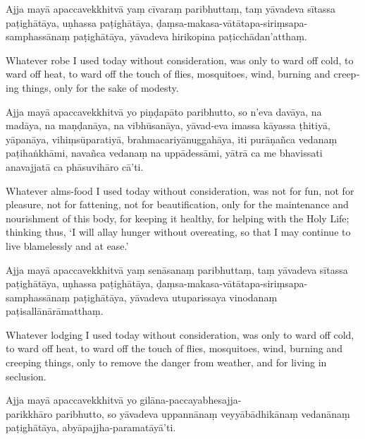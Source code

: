 \begin{leader}
\end{leader}


Ajja mayā apaccavekkhitvā yaṃ cīvaraṃ paribhuttaṃ, taṃ yāvadeva sītassa
paṭighātāya, uṇhassa paṭighātāya, ḍaṃsa-makasa-vātātapa-siriṃsapa-samphassānaṃ
paṭighātāya, yāvadeva hirikopina paṭicchādan'atthaṃ.

\begin{english}
  Whatever robe I used today without consideration, was only to ward off cold,
  to ward off heat, to ward off the touch of flies, mosquitoes, wind, burning
  and creeping things, only for the sake of modesty.
\end{english}

Ajja mayā apaccavekkhitvā yo piṇḍapāto paribhutto, so n'eva davāya, na madāya,
na maṇḍanāya, na vibhūsanāya, yāvad-eva imassa kāyassa ṭhitiyā, yāpanāya,
vihiṃsūparatiyā, brahmacariyānuggahāya, iti purāṇañca vedanaṃ paṭihaṅkhāmi,
navañca vedanaṃ na uppādessāmi, yātrā ca me bhavissati anavajjatā ca phāsuvihāro
cā'ti.

\begin{english}
  Whatever alms-food I used today without consideration, was not for fun, not
  for pleasure, not for fattening, not for beautification, only for the
  maintenance and nourishment of this body, for keeping it healthy, for helping
  with the Holy Life; thinking thus, `I will allay hunger without overeating, so
  that I may continue to live blamelessly and at ease.'
\end{english}

Ajja mayā apaccavekkhitvā yaṃ senāsanaṃ paribhuttaṃ, taṃ yāvadeva sītassa
paṭighātāya, uṇhassa paṭighātāya, ḍaṃsa-makasa-vātātapa-siriṃsapa-samphassānaṃ
paṭighātāya, yāvadeva utuparissaya vinodanaṃ paṭisallānārāmatthaṃ.

\begin{english}
  Whatever lodging I used today without consideration, was only to ward off
  cold, to ward off heat, to ward off the touch of flies, mosquitoes, wind,
  burning and creeping things, only to remove the danger from weather, and for
  living in seclusion.
\end{english}

Ajja mayā apaccavekkhitvā yo gilāna-paccayabhesajja-\\ parikkhāro paribhutto, so
yāvadeva uppannānaṃ veyyābādhikānaṃ vedanānaṃ paṭighātāya,
abyāpajjha-paramatāyā'ti.

